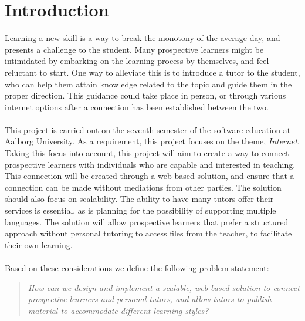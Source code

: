 \chapter{Introduction}\label{chap:introduction}
Learning a new skill is a way to break the monotony of the average day, and presents a challenge to the student.
Many prospective learners might be intimidated by embarking on the learning process by themselves, and feel reluctant to start.
One way to alleviate this is to introduce a tutor to the student, who can help them attain knowledge related to the topic and guide them in the proper direction.
This guidance could take place in person, or through various internet options after a connection has been established between the two.
\\\\
This project is carried out on the seventh semester of the software education at Aalborg University. 
As a requirement, this project focuses on the theme, \textit{Internet}.
Taking this focus into account, this project will aim to create a way to connect prospective learners with individuals who are capable and interested in teaching.
This connection will be created through a web-based solution, and ensure that a connection can be made without mediations from other parties.
The solution should also focus on scalability. 
The ability to have many tutors offer their services is essential, as is planning for the possibility of supporting multiple languages. 
The solution will allow prospective learners that prefer a structured approach without personal tutoring to access files from the teacher, to facilitate their own learning.
\\\\
Based on these considerations we define the following problem statement:
\begin{quote}
    \textit{How can we design and implement a scalable, web-based solution to connect prospective learners and personal tutors, and allow tutors to publish material to accommodate different learning styles?}
\end{quote}
